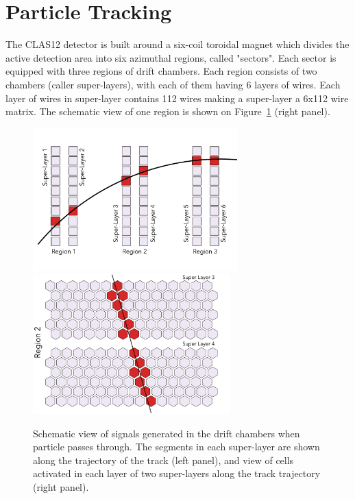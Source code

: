 \section{Particle Tracking}

The CLAS12\cite{Burkert:2020akg} detector is built around a six-coil toroidal magnet which divides the active detection area into six azimuthal regions, called "sectors". Each sector is equipped with three regions of drift chambers. Each region consists of two chambers (caller super-layers), with each of them having 6 layers of wires. Each layer of wires in super-layer contains 112 wires making a super-layer a 6x112 wire matrix. The schematic view of one region  is shown on Figure~\ref{dc:side_view} (right panel).

\begin{figure}[!ht]
\begin{center}
 \includegraphics[width=3.1in]{images/dc_diagram.pdf}
 \includegraphics[width=3in]{images/region_2_diagram.pdf}
\caption {Schematic view of signals generated in the drift chambers when particle passes through. The segments in each super-layer are shown along the trajectory of the track (left panel), and view of cells activated in each layer of two super-layers along the track trajectory (right panel).}
 \label{dc:side_view}
 \end{center}
\end{figure}

